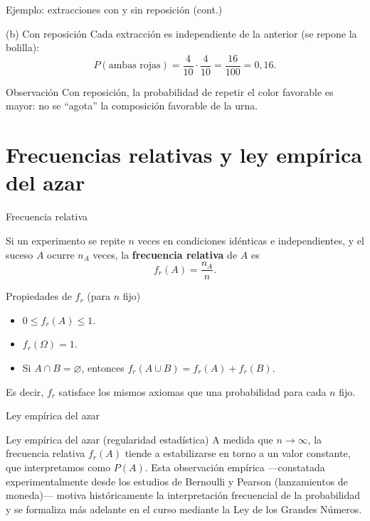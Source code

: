 \documentclass[aspectratio=169,11pt]{beamer}
\begin{document}
\begin{frame}{Ejemplo: extracciones con y sin reposición (cont.)}
\begin{block}{(b) Con reposición}
Cada extracción es independiente de la anterior (se repone la bolilla):
\[
P(\text{ambas rojas}) = \frac{4}{10}\cdot\frac{4}{10} = \frac{16}{100} = 0{,}16.
\]
\end{block}
\begin{alertblock}{Observación}
Con reposición, la probabilidad de repetir el color favorable es mayor: no se ``agota'' la composición favorable de la urna.
\end{alertblock}
\end{frame}

\section{Frecuencias relativas y ley empírica del azar}

\begin{frame}{Frecuencia relativa}
\begin{definition}
Si un experimento se repite $n$ veces en condiciones idénticas e independientes, y el suceso $A$ ocurre $n_A$ veces, la \textbf{frecuencia relativa} de $A$ es
\[
f_r(A) = \frac{n_A}{n}.
\]
\end{definition}
\begin{block}{Propiedades de $f_r$ (para $n$ fijo)}
\begin{itemize}
\item $0 \leq f_r(A) \leq 1$.
\item $f_r(\Omega) = 1$.
\item Si $A\cap B=\varnothing$, entonces $f_r(A\cup B) = f_r(A)+f_r(B)$.
\end{itemize}
Es decir, $f_r$ satisface los mismos axiomas que una probabilidad para cada $n$ fijo.
\end{block}
\end{frame}

\begin{frame}{Ley empírica del azar}
\begin{block}{Ley empírica del azar (regularidad estadística)}
A medida que $n\to\infty$, la frecuencia relativa $f_r(A)$ tiende a estabilizarse en torno a un valor constante, que interpretamos como $P(A)$. Esta observación empírica —constatada experimentalmente desde los estudios de Bernoulli y Pearson (lanzamientos de moneda)— motiva históricamente la interpretación frecuencial de la probabilidad y se formaliza más adelante en el curso mediante la Ley de los Grandes Números.
\end{block}
\end{frame}
\end{document}
